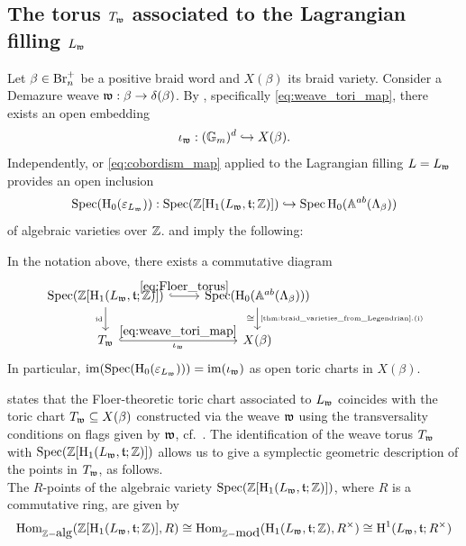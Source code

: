\subsection{The torus $T_{\mathfrak{w}}$ associated to the Lagrangian filling $L_{\mathfrak{w}}$}\label{ssec:torus_Lagrangian_filling_from_weave} Let $\beta\in\mbox{Br}_n^+$ be a positive braid word and $X(\beta)$ its braid variety. Consider a Demazure weave $\mathfrak{w}:\beta\to\delta(\beta)$. By , specifically \eqref{eq:weave_tori_map}, there exists an open embedding
$$\iota_{\mathfrak{w}}:(\mathbb{G}_m)^d\hookrightarrow X(\beta).$$
\noindent Independently,  or \eqref{eq:cobordism_map} applied to the Lagrangian filling $L=L_{\mathfrak{w}}$ provides an open inclusion
\begin{equation}\label{eq:Floer_torus}
\operatorname{Spec}(\operatorname{H}_0(\varepsilon_{L_{\mathfrak{w}}})):\operatorname{Spec}(\mathbb{Z}[\operatorname{H}_1(L_{\mathfrak{w}},\mathfrak{t};\mathbb{Z})])\hookrightarrow \operatorname{Spec}\mbox{H}_0(\mathbb{A}^{ab}(\Lambda_{\beta}))
\end{equation}
of algebraic varieties over $\mathbb{Z}$.  and \cite[Section 5]{CasalsNg22} imply the following:
\begin{proposition}\label{prop:weave_tori_and_Lagrangian_fillings}
In the notation above, there exists a commutative diagram
\[
\begin{tikzcd}
    \Spec(\Z[\hH_1(L_\w,\tt;\Z)]) \arrow[r, hook,"\eqref{eq:Floer_torus}"] \arrow[d, "\tiny\mbox{id}"'] & \Spec(\hH_0(\mathbb{A}^{ab}(\La_\beta))) \arrow[d, "\mbox{\tiny\Cref{thm:braid_varieties_from_Legendrian}.(i)}","\cong"
'] \\
    T_\w \arrow[r, hook,"\iota_\w"',"\eqref{eq:weave_tori_map}"] & X(\beta)
\end{tikzcd}
\]
In particular, $\operatorname{im}(\operatorname{Spec}(\operatorname{H}_0(\varepsilon_{L_{\mathfrak{w}}})))=\operatorname{im}(\iota_{\mathfrak{w}})$
as open toric charts in $X(\beta)$.\sbs
\end{proposition}
\noindent {} states that the Floer-theoretic toric chart associated to $L_{\mathfrak{w}}$ coincides with the toric chart $T_{\mathfrak{w}}\subseteq X(\beta)$ constructed via the weave $\mathfrak{w}$ using the transversality conditions on flags given by $\mathfrak{w}$, cf.~. The identification of the weave torus $T_{\mathfrak{w}}$ with $\operatorname{Spec}(\mathbb{Z}[\operatorname{H}_1(L_{\mathfrak{w}},\mathfrak{t};\mathbb{Z})])$ allows us to give a symplectic geometric description of the points in $T_{\mathfrak{w}}$, as follows.\\

\noindent The $R$-points of the algebraic variety $\operatorname{Spec}(\mathbb{Z}[\operatorname{H}_1(L_{\mathfrak{w}},\mathfrak{t};\mathbb{Z})])$, where $R$ is a commutative ring, are given by
\begin{equation}\label{eq:points_of_Tw}
\mbox{Hom}_{\mathbb{Z}-\mbox{alg}}(\mathbb{Z}[\operatorname{H}_1(L_{\mathfrak{w}},\mathfrak{t};\mathbb{Z})],R)\cong \mbox{Hom}_{\mathbb{Z}-\mbox{mod}}(\operatorname{H}_1(L_{\mathfrak{w}},\mathfrak{t};\mathbb{Z}),R^\times)\cong \operatorname{H}^1(L_{\mathfrak{w}},\mathfrak{t};R^\times)
\end{equation}

